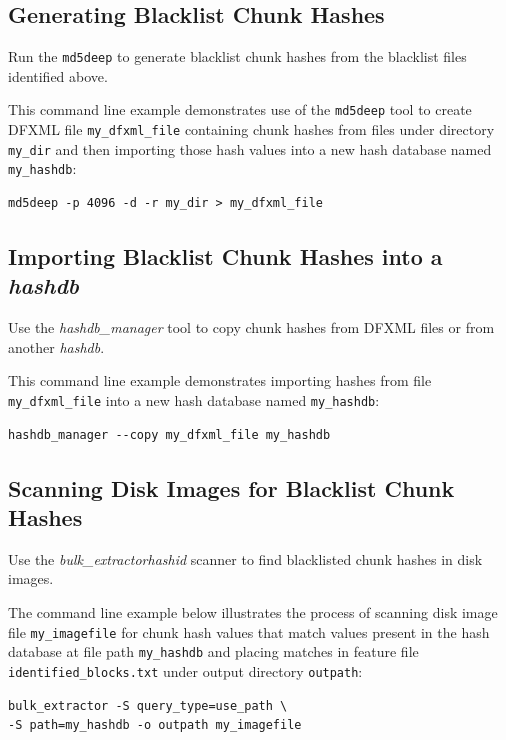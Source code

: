 \documentclass[11pt,twoside]{article}
\newcommand \bulk {\textit{bulk\_extractor}\xspace}
\newcommand \hdb {\textit{hashdb}\xspace}
\newcommand \hdbm {\textit{hashdb\_manager}\xspace}
\newcommand \hid {\textit{hashid}\xspace}
\begin{document}
\subsection{Generating Blacklist Chunk Hashes}
Run the \texttt{md5deep} to generate blacklist chunk hashes
from the blacklist files identified above.

This command line example demonstrates use of the \texttt{md5deep} tool
to create DFXML file \texttt{my\_dfxml\_file}
containing chunk hashes from files under directory \texttt{my\_dir}
and then importing those hash values into a new hash database
named \texttt{my\_hashdb}:

\begin{small}
\begin{verbatim}
md5deep -p 4096 -d -r my_dir > my_dfxml_file
\end{verbatim}
\end{small}

\subsection{Importing Blacklist Chunk Hashes into a \hdb}
Use the \hdbm tool to copy chunk hashes from DFXML files
or from another \hdb.

This command line example demonstrates importing
hashes from file \texttt{my\_dfxml\_file}
into a new hash database named \texttt{my\_hashdb}:

\begin{small}
\begin{verbatim}
hashdb_manager --copy my_dfxml_file my_hashdb
\end{verbatim}
\end{small}

\subsection{Scanning Disk Images for Blacklist Chunk Hashes}
Use the \bulk \hid scanner to find blacklisted chunk hashes in disk images.

The command line example below illustrates the process of scanning
disk image file \texttt{my\_imagefile}
for chunk hash values that match values present
in the hash database at file path \texttt{my\_hashdb} and placing
matches in feature file \texttt{identified\_blocks.txt}
under output directory \texttt{outpath}:

\begin{small}
\begin{verbatim}
bulk_extractor -S query_type=use_path \
-S path=my_hashdb -o outpath my_imagefile
\end{verbatim}
\end{small}
\end{document}
